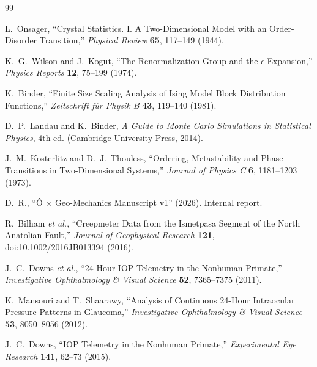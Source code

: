 \documentclass[aps,prl,twocolumn,superscriptaddress,byrevtex]{article}
\begin{document}
\begin{thebibliography}{99}

L.~Onsager, ``Crystal Statistics. I. A Two-Dimensional Model with an
Order-Disorder Transition,'' \emph{Physical Review} \textbf{65}, 117--149 (1944).

K.~G.~Wilson and J.~Kogut, ``The Renormalization Group and the $\epsilon$
Expansion,'' \emph{Physics Reports} \textbf{12}, 75--199 (1974).

K.~Binder, ``Finite Size Scaling Analysis of Ising Model Block Distribution
Functions,'' \emph{Zeitschrift f\"ur Physik B} \textbf{43}, 119--140 (1981).

D.~P.~Landau and K.~Binder, \emph{A Guide to Monte Carlo Simulations in
Statistical Physics}, 4th ed. (Cambridge University Press, 2014).

J.~M.~Kosterlitz and D.~J.~Thouless, ``Ordering, Metastability and Phase
Transitions in Two-Dimensional Systems,'' \emph{Journal of Physics C}
\textbf{6}, 1181--1203 (1973).

D.~R., ``\^O $\times$ Geo-Mechanics Manuscript v1'' (2026). Internal report.

R.~Bilham \emph{et al.}, ``Creepmeter Data from the Ismetpasa Segment
of the North Anatolian Fault,'' \emph{Journal of Geophysical Research}
\textbf{121}, doi:10.1002/2016JB013394 (2016).

J.~C.~Downs \emph{et al.}, ``24-Hour IOP Telemetry in the Nonhuman Primate,''
\emph{Investigative Ophthalmology \& Visual Science} \textbf{52}, 7365--7375 (2011).

K.~Mansouri and T.~Shaarawy, ``Analysis of Continuous 24-Hour Intraocular
Pressure Patterns in Glaucoma,'' \emph{Investigative Ophthalmology \& Visual
Science} \textbf{53}, 8050--8056 (2012).

J.~C.~Downs, ``IOP Telemetry in the Nonhuman Primate,'' \emph{Experimental
Eye Research} \textbf{141}, 62--73 (2015).

\end{thebibliography}
\end{document}
